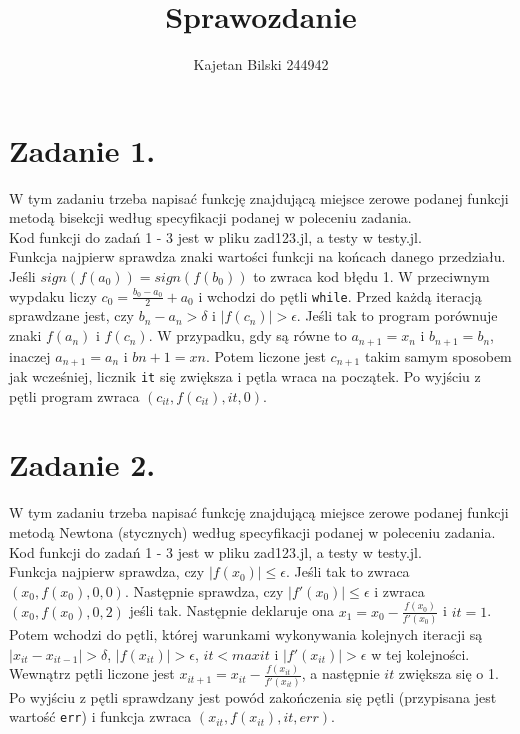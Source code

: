 \documentclass{article}
\title{Sprawozdanie}
\author{Kajetan Bilski 244942}
\begin{document}
	\maketitle

\section{Zadanie 1.}
W tym zadaniu trzeba napisać funkcję znajdującą miejsce zerowe podanej funkcji metodą bisekcji według specyfikacji podanej w poleceniu zadania.\\
Kod funkcji do zadań 1 - 3 jest w pliku zad123.jl, a testy w testy.jl.\\
Funkcja najpierw sprawdza znaki wartości funkcji na końcach danego przedziału. Jeśli $sign(f(a_{0})) = sign(f(b_{0}))$ to zwraca kod błędu 1. W przeciwnym wypdaku liczy $c_{0}=\frac{b_{0}-a_{0}}{2}+a_{0}$ i wchodzi do pętli \verb|while|. Przed każdą iteracją sprawdzane jest, czy $b_{n}-a_{n}>\delta$ i $|f(c_{n})|>\epsilon$. Jeśli tak to program porównuje znaki $f(a_{n})$ i $f(c_{n})$. W przypadku, gdy są równe to $a_{n+1}=x_{n}$ i $b_{n+1}=b_{n}$, inaczej $a_{n+1}=a_{n}$ i $b{n+1}=x{n}$. Potem liczone jest $c_{n+1}$ takim samym sposobem jak wcześniej, licznik \verb|it| się zwiększa i pętla wraca na początek. Po wyjściu z pętli program zwraca $(c_{it}, f(c_{it}), it, 0)$.
\section{Zadanie 2.}
W tym zadaniu trzeba napisać funkcję znajdującą miejsce zerowe podanej funkcji metodą Newtona (stycznych) według specyfikacji podanej w poleceniu zadania.\\
Kod funkcji do zadań 1 - 3 jest w pliku zad123.jl, a testy w testy.jl.\\
Funkcja najpierw sprawdza, czy $|f(x_{0})|\leq\epsilon$. Jeśli tak to zwraca $(x_{0}, f(x_{0}), 0, 0)$. Następnie sprawdza, czy $|f'(x_{0})|\leq\epsilon$ i zwraca $(x_{0}, f(x_{0}), 0, 2)$ jeśli tak. Następnie deklaruje ona $x_{1}=x_{0}-\frac{f(x_{0})}{f'(x_{0})}$ i $it = 1$. Potem wchodzi do pętli, której warunkami wykonywania kolejnych iteracji są $|x_{it}-x_{it-1}|>\delta$, $|f(x_{it})|>\epsilon$, $it < maxit$ i $|f'(x_{it})|>\epsilon$ w tej kolejności. Wewnątrz pętli liczone jest $x_{it+1}=x_{it}-\frac{f(x_{it})}{f'(x_{it})}$, a następnie $it$ zwiększa się o 1. Po wyjściu z pętli sprawdzany jest powód zakończenia się pętli (przypisana jest wartość \verb|err|) i funkcja zwraca $(x_{it}, f(x_{it}), it, err)$.
\end{document}
